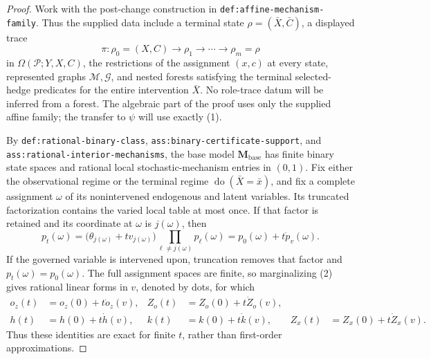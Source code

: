\documentclass{article}
\begin{document}
\begin{proof}
Work with the post-change construction in \texttt{def:affine-mechanism-family}.  Thus the supplied data include a terminal state \(\rho=(\bar X,\bar C)\), a displayed trace
\[
 \pi:\rho_0=(X,C)\longrightarrow\rho_1\longrightarrow\cdots
 \longrightarrow\rho_m=\rho                                      \tag{1}
\]
in \(\Omega(\mathcal P;Y,X,C)\), the restrictions of the assignment \((x,c)\) at every state, represented graphs \(\mathcal M,\mathcal G\), and nested forests satisfying the terminal selected-hedge predicates for the entire intervention \(\bar X\).  No role-trace datum will be inferred from a forest.  The algebraic part of the proof uses only the supplied affine family; the transfer to \(\psi\) will use exactly (1).

By \texttt{def:rational-binary-class}, \texttt{ass:binary-certificate-support}, and \texttt{ass:rational-interior-mechanisms}, the base model \(\mathbf M_{\mathrm{base}}\) has finite binary state spaces and rational local stochastic-mechanism entries in \((0,1)\).  Fix either the observational regime or the terminal regime \(\operatorname{do}(\bar X=\bar x)\), and fix a complete assignment \(\omega\) of its nonintervened endogenous and latent variables.  Its truncated factorization contains the varied local table at most once.  If that factor is retained and its coordinate at \(\omega\) is \(j(\omega)\), then
\[
 p_t(\omega)
 =\bigl(\theta_{j(\omega)}+t v_{j(\omega)}\bigr)
   \prod_{\ell\ne j(\omega)}p_\ell(\omega)
 =p_0(\omega)+t\dot p_v(\omega).                              \tag{2}
\]
If the governed variable is intervened upon, truncation removes that factor and \(p_t(\omega)=p_0(\omega)\).  The full assignment spaces are finite, so marginalizing (2) gives rational linear forms in \(v\), denoted by dots, for which
\[
\begin{aligned}
 o_z(t)&=o_z(0)+t\dot o_z(v),&
 Z_o(t)&=Z_o(0)+t\dot Z_o(v),\\
 h(t)&=h(0)+t\dot h(v),&
 k(t)&=k(0)+t\dot k(v),&
 Z_x(t)&=Z_x(0)+t\dot Z_x(v).
\end{aligned}                                                   \tag{3}
\]
Thus these identities are exact for finite \(t\), rather than first-order approximations.


\end{proof}
\end{document}
